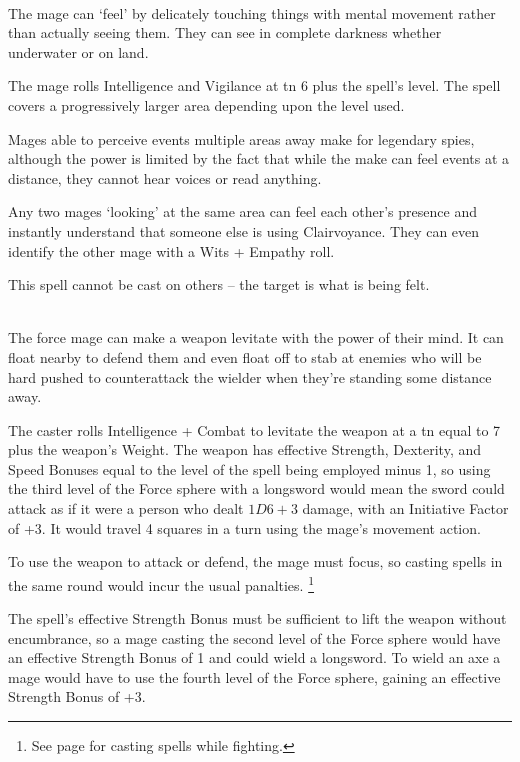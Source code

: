 \begin{multicols}{2}
\spelllevel

\\
The mage can `feel' by delicately touching things with mental movement rather than actually seeing them. They can see in complete darkness whether underwater or on land.

The mage rolls Intelligence and Vigilance at \gls{tn} 6 plus the spell's level.
The spell covers a progressively larger area depending upon the level used.

Mages able to perceive events multiple areas away make for legendary spies, although the power is limited by the fact that while the make can feel events at a distance, they cannot hear voices or read anything.

Any two mages `looking' at the same area can feel each other's presence and instantly understand that someone else is using Clairvoyance.
They can even identify the other mage with a Wits + Empathy roll.

This spell cannot be cast on others -- the target is what is being felt.

\\
The force mage can make a weapon levitate with the power of their mind. It can float nearby to defend them and even float off to stab at enemies who will be hard pushed to counterattack the wielder when they're standing some distance away.

The caster rolls Intelligence + Combat to levitate the weapon at a \gls{tn} equal to 7 plus the weapon's Weight.
The weapon has effective Strength, Dexterity, and Speed Bonuses equal to the level of the spell being employed minus 1, so using the third level of the Force sphere with a longsword would mean the sword could attack as if it were a person who dealt $1D6+3$ damage, with an Initiative Factor of +3.
It would travel 4 squares in a turn using the mage's movement action.

To use the weapon to attack or defend, the mage must focus, so casting spells in the same round would incur the usual panalties.%
\footnote{See page \pageref{combatcasting} for casting spells while fighting.}

The spell's effective Strength Bonus must be sufficient to lift the weapon without encumbrance, so a mage casting the second level of the Force sphere would have an effective Strength Bonus of 1 and could wield a longsword.
To wield an axe a mage would have to use the fourth level of the Force sphere, gaining an effective Strength Bonus of +3.


\end{multicols}
